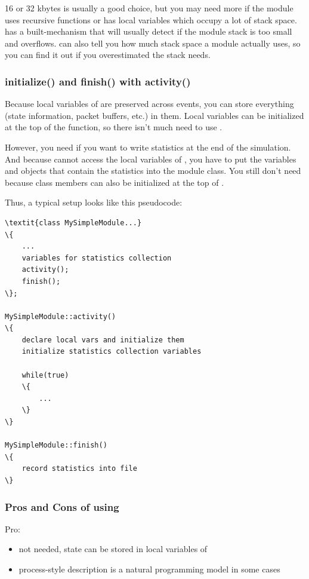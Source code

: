 16 or 32 kbytes is usually a good choice, but you may need more if the
module uses recursive functions or has local variables which occupy a
lot of stack space. {\opp} has a built-mechanism that will usually
detect if the module stack is too small and
overflows. {\opp} can also tell you how much
stack space a module actually uses, so you can find
it out if you overestimated the stack needs.


\subsubsection{initialize() and finish() with activity()}


Because local variables of  are preserved across
events, you can store everything (state information, packet buffers,
etc.) in them. Local variables can be initialized at the top of the
 function, so there isn't much need to use
.


However, you need  if you want to write statistics at
the end of the simulation. And because  cannot access
the local variables of , you have to put the variables
and objects that contain the statistics into the module class.
You still don't need  because class members can also
be initialized at the top of .


Thus, a typical setup looks like this pseudocode:


\begin{Verbatim}[commandchars=\\\{\}]
\textit{class MySimpleModule...}
\{
    ...
    variables for statistics collection
    activity();
    finish();
\};

MySimpleModule::activity()
\{
    declare local vars and initialize them
    initialize statistics collection variables

    while(true)
    \{
        ...
    \}
\}

MySimpleModule::finish()
\{
    record statistics into file
\}
\end{Verbatim}


\subsubsection{Pros and Cons of using }


Pro:
\begin{itemize}
   \item{ not needed, state can be stored in local
       variables of }
   \item{process-style description is a natural programming model in some cases}
\end{itemize}

